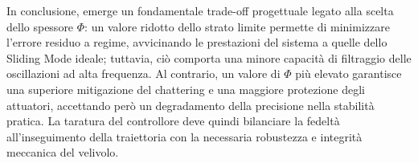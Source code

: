 In conclusione, emerge un fondamentale trade-off progettuale legato alla scelta dello spessore $\Phi$: un valore ridotto dello strato limite permette di minimizzare l'errore residuo a regime, avvicinando le prestazioni del sistema a quelle dello Sliding Mode ideale; tuttavia, ciò comporta una minore capacità di filtraggio delle oscillazioni ad alta frequenza. Al contrario, un valore di $\Phi$ più elevato garantisce una superiore mitigazione del chattering e una maggiore protezione degli attuatori, accettando però un degradamento della precisione nella stabilità pratica. La taratura del controllore deve quindi bilanciare la fedeltà all'inseguimento della traiettoria con la necessaria robustezza e integrità meccanica del velivolo.

\clearpage